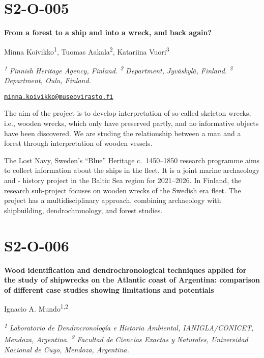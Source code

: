 \documentclass[
]{book}
\begin{document}
\hypertarget{s2-o-005}{%
\section*{S2-O-005}\label{s2-o-005}}

\textbf{From a forest to a ship and into a wreck, and back again?}

Minna Koivikko\textsuperscript{1}, Tuomas Aakala\textsuperscript{2}, Katariina Vuori\textsuperscript{3}

\textsuperscript{\emph{1}} \emph{Finnish Heritage Agency, Finland. \textsuperscript{2} Department, Jyväskylä, Finland. \textsuperscript{3} Department, Oulu, Finland.}

\href{mailto:minna.koivikko@museovirasto.fi}{\nolinkurl{minna.koivikko@museovirasto.fi}}

The aim of the project is to develop interpretation of so-called skeleton wrecks, i.e., wooden wrecks, which only have preserved partly, and no informative objects have been discovered. We are studing the relationship between a man and a forest through interpretation of wooden vessels.

The Lost Navy, Sweden's ``Blue'' Heritage c.~1450--1850 research programme aims to collect information about the ships in the fleet. It is a joint marine archaeology and - history project in the Baltic Sea region for 2021--2026. In Finland, the research sub-project focuses on wooden wrecks of the Swedish era fleet. The project has a multidisciplinary approach, combining archaeology with shipbuilding, dendrochronology, and forest studies.

\hypertarget{s2-o-006}{%
\section*{S2-O-006}\label{s2-o-006}}

\textbf{Wood identification and dendrochronological techniques applied for the study of shipwrecks on the Atlantic coast of Argentina: comparison of different case studies showing limitations and potentials}

Ignacio A. Mundo\textsuperscript{1,2}

\textsuperscript{\emph{1}} \emph{Laboratorio de Dendrocronología e Historia Ambiental, IANIGLA/CONICET, Mendoza, Argentina. \textsuperscript{2} Facultad de Ciencias Exactas y Naturales, Universidad Nacional de Cuyo, Mendoza, Argentina.}
\end{document}
